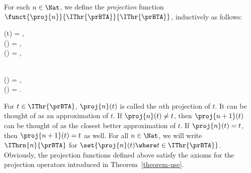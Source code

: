 \documentclass{llncs}
\begin{document}
\sloppy
For each $n \in \Nat$, we define the \emph{projection} function
$\funct{\proj{n}}{\IThr{\prBTA}}{\IThr{\prBTA}}$, inductively as 
follows:
\begin{ldispl}
\begin{geqns}
(t) = \DeadEnd\;, 
\\
(\Stop)  = \Stop\;, 
\\
(\DeadEnd) = \DeadEnd\;, 
\\
\end{geqns}
\quad\;\;
\begin{geqns}
{} \\
() = \;,
\\
() = \;.
\end{geqns}
\end{ldispl}For $t \in \IThr{\prBTA}$, $\proj{n}(t)$ is called the $n$th projection
of $t$.
It can be thought of as an approximation of $t$.
If $\proj{n}(t) \neq t$, then $\proj{n+1}(t)$ can be thought of as the
closest better approximation of $t$.
If $\proj{n}(t) = t$, then $\proj{n+1}(t) = t$ as well.
For all $n \in \Nat$, we will write $\IThrn{n}{\prBTA}$ for
$\set{\proj{n}(t) \where t \in \IThr{\prBTA}}$.
Obviously, the projection functions defined above satisfy the axioms for 
the projection operators introduced in Theorem~\ref{theorem-use}.
\end{document}
